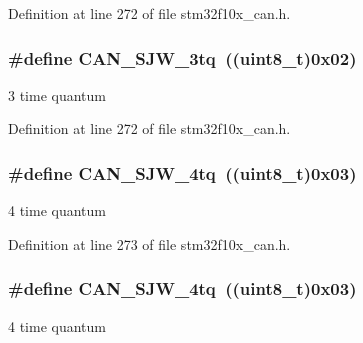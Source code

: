 Definition at line 272 of file stm32f10x\+\_\+can.\+h.

\subsubsection[{\texorpdfstring{C\+A\+N\+\_\+\+S\+J\+W\+\_\+3tq}{CAN_SJW_3tq}}]{\setlength{\rightskip}{0pt plus 5cm}\#define C\+A\+N\+\_\+\+S\+J\+W\+\_\+3tq~(({\bf uint8\+\_\+t})0x02)}\hypertarget{group___c_a_n__synchronisation__jump__width_gab4de740e2184aac71c2c8cba22a8ecd2}{}\label{group___c_a_n__synchronisation__jump__width_gab4de740e2184aac71c2c8cba22a8ecd2}
3 time quantum 

Definition at line 272 of file stm32f10x\+\_\+can.\+h.

\subsubsection[{\texorpdfstring{C\+A\+N\+\_\+\+S\+J\+W\+\_\+4tq}{CAN_SJW_4tq}}]{\setlength{\rightskip}{0pt plus 5cm}\#define C\+A\+N\+\_\+\+S\+J\+W\+\_\+4tq~(({\bf uint8\+\_\+t})0x03)}\hypertarget{group___c_a_n__synchronisation__jump__width_ga7f26a36d478c7ba1a1441b369d62f693}{}\label{group___c_a_n__synchronisation__jump__width_ga7f26a36d478c7ba1a1441b369d62f693}
4 time quantum 

Definition at line 273 of file stm32f10x\+\_\+can.\+h.

\subsubsection[{\texorpdfstring{C\+A\+N\+\_\+\+S\+J\+W\+\_\+4tq}{CAN_SJW_4tq}}]{\setlength{\rightskip}{0pt plus 5cm}\#define C\+A\+N\+\_\+\+S\+J\+W\+\_\+4tq~(({\bf uint8\+\_\+t})0x03)}\hypertarget{group___c_a_n__synchronisation__jump__width_ga7f26a36d478c7ba1a1441b369d62f693}{}\label{group___c_a_n__synchronisation__jump__width_ga7f26a36d478c7ba1a1441b369d62f693}
4 time quantum 

